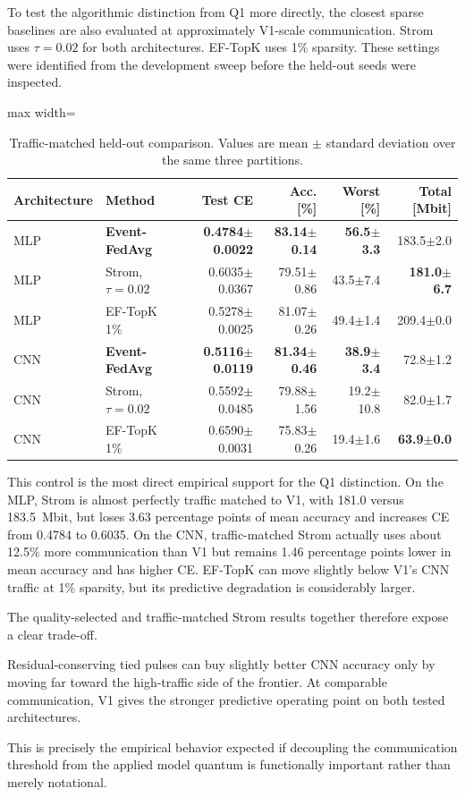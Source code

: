 To test the algorithmic distinction from Q1 more directly, the closest sparse baselines are also evaluated at approximately V1-scale communication. Strom uses $\tau=0.02$ for both architectures. EF-TopK uses 1\% sparsity. These settings were identified from the development sweep before the held-out seeds were inspected.

\begin{table}[ht]
\centering
\small
\caption{Traffic-matched held-out comparison. Values are mean $\pm$ standard deviation over the same three partitions.}
\label{tab:final-baseline-traffic}
\begin{adjustbox}{max width=\textwidth}
\begin{tabular}{llrrrr}
\toprule
Architecture & Method & Test CE & Acc. [\%] & Worst [\%] & Total [Mbit]\\
\midrule
MLP & \textbf{Event-FedAvg} & \textbf{0.4784$\pm$0.0022} & \textbf{83.14$\pm$0.14} & \textbf{56.5$\pm$3.3} & 183.5$\pm$2.0\\
MLP & Strom, $\tau=0.02$ & 0.6035$\pm$0.0367 & 79.51$\pm$0.86 & 43.5$\pm$7.4 & \textbf{181.0$\pm$6.7}\\
MLP & EF-TopK 1\% & 0.5278$\pm$0.0025 & 81.07$\pm$0.26 & 49.4$\pm$1.4 & 209.4$\pm$0.0\\
\midrule
CNN & \textbf{Event-FedAvg} & \textbf{0.5116$\pm$0.0119} & \textbf{81.34$\pm$0.46} & \textbf{38.9$\pm$3.4} & 72.8$\pm$1.2\\
CNN & Strom, $\tau=0.02$ & 0.5592$\pm$0.0485 & 79.88$\pm$1.56 & 19.2$\pm$10.8 & 82.0$\pm$1.7\\
CNN & EF-TopK 1\% & 0.6590$\pm$0.0031 & 75.83$\pm$0.26 & 19.4$\pm$1.6 & \textbf{63.9$\pm$0.0}\\
\bottomrule
\end{tabular}
\end{adjustbox}
\end{table}

This control is the most direct empirical support for the Q1 distinction. On the MLP, Strom is almost perfectly traffic matched to V1, with 181.0 versus 183.5~Mbit, but loses 3.63 percentage points of mean accuracy and increases CE from 0.4784 to 0.6035. On the CNN, traffic-matched Strom actually uses about 12.5\% more communication than V1 but remains 1.46 percentage points lower in mean accuracy and has higher CE. EF-TopK can move slightly below V1's CNN traffic at 1\% sparsity, but its predictive degradation is considerably larger.

The quality-selected and traffic-matched Strom results together therefore expose a clear trade-off.
\begin{takeawaybox}[title={Final nearest-neighbor result}]
Residual-conserving tied pulses can buy slightly better CNN accuracy only by moving far toward the high-traffic side of the frontier. At comparable communication, V1 gives the stronger predictive operating point on both tested architectures.
\end{takeawaybox}
This is precisely the empirical behavior expected if decoupling the communication threshold from the applied model quantum is functionally important rather than merely notational.

